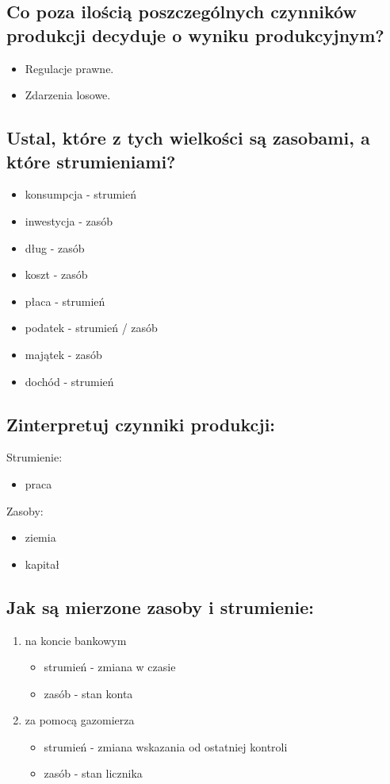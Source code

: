 \documentclass[a4paper,12pt]{article}
\begin{document}
\subsection{Co poza ilością poszczególnych czynników produkcji decyduje o wyniku produkcyjnym?}

\begin{itemize}
	\item Regulacje prawne.
	\item Zdarzenia losowe.
\end{itemize}

\subsection{Ustal, które z tych wielkości są zasobami, a które strumieniami?}

\begin{itemize}
	\item konsumpcja - strumień
	\item inwestycja - zasób
	\item dług - zasób
	\item koszt - zasób
	\item płaca - strumień
	\item podatek - strumień / zasób
	\item majątek - zasób
	\item dochód - strumień
\end{itemize}

\subsection{Zinterpretuj czynniki produkcji:}

Strumienie:
\begin{itemize}
	\item praca
\end{itemize}
Zasoby:
\begin{itemize}
	\item ziemia
	\item kapitał
\end{itemize}

\subsection{Jak są mierzone zasoby i strumienie:}
\begin{enumerate}
	\item na koncie bankowym
	      \begin{itemize}
		      \item strumień - zmiana w czasie
		      \item zasób - stan konta
	      \end{itemize}
	\item za pomocą gazomierza
	      \begin{itemize}
		      \item strumień - zmiana wskazania od ostatniej kontroli
		      \item zasób - stan licznika
	      \end{itemize}
\end{enumerate}
\end{document}
